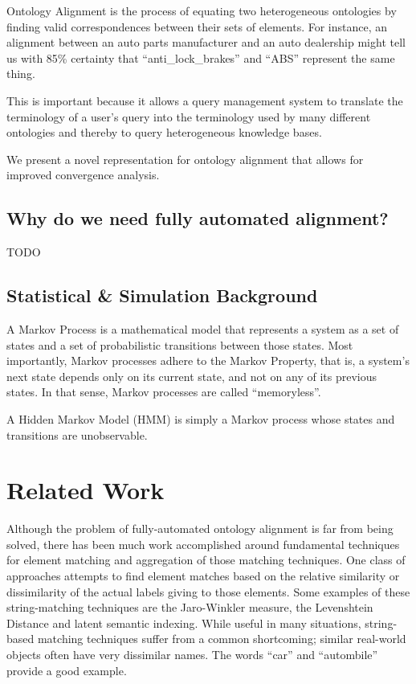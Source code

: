 \documentclass[letterpaper,twocolumn,12pt]{article}
\begin{document}
Ontology Alignment is the process of equating two heterogeneous ontologies by
finding valid correspondences between their sets of elements. 
%
For instance, an alignment between an auto parts manufacturer and an auto dealership
might tell us with 85\% certainty that ``anti\_lock\_brakes'' and ``ABS'' represent
the same thing.

This is important because it allows a query management system to translate the terminology
of a user's query into the terminology used by many different ontologies and thereby
to query heterogeneous knowledge bases.

We present a novel representation for ontology alignment that allows for improved
convergence analysis.

\subsection{Why do we need fully automated alignment?}
\label{subsec:automated}

TODO

\subsection{Statistical \& Simulation Background}
\label{subsec:stat}

A Markov Process is a mathematical model that represents a system as a set of states
and a set of probabilistic transitions between those states. Most importantly, Markov 
processes adhere to the Markov Property, that is, a system's next state depends only
on its current state, and not on any of its previous states. In that sense, Markov
processes are called ``memoryless''.

A Hidden Markov Model (HMM) is simply a Markov process whose states and transitions
are unobservable.

\section{Related Work}

Although the problem of fully-automated ontology alignment is far from being solved,
there has been much work accomplished around fundamental techniques for element
matching and aggregation of those matching techniques. One class of approaches
attempts to find element matches based on the relative similarity or dissimilarity
of the actual labels giving to those elements. Some examples of these string-matching 
techniques are the Jaro-Winkler measure, the Levenshtein Distance and latent semantic 
indexing.
%
While useful in many situations, string-based matching techniques suffer from a common 
shortcoming; similar real-world objects often have very dissimilar names. The words
``car'' and ``autombile'' provide a good example.
\end{document}
